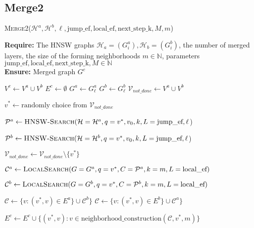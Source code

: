 \documentclass{article}
\begin{document}
\subsection{Merge2}





\begin{algorithm}
\caption{\textsc{Merge2}($\mathcal{H}^a, \mathcal{H}^b,  \ell, \text{jump\_ef}, \text{local\_ef}, \text{next\_step\_k}, M, m$)}\label{alg:merge2}
\textbf{Require:} The HNSW graphs $\mathcal{H}_a = (G^a_i), \mathcal{H}_b = (G^b_i)$, the number of merged layers, the size of the forming neighborhoods $m \in \mathbb{N} $, parameters $\text{jump\_ef}, \text{local\_ef}, \text{next\_step\_k}, M \in \mathbb{N}$ \\
\textbf{Ensure:}  Merged graph $G^c$ 
\begin{algorithmic}[1]

\State $V^c \gets V^a \cup V^b$
\State $E^c \gets \emptyset$
\State $G^a \gets G^a_{\ell} $
\State $G^b \gets G^b_{\ell} $
\State $\mathcal{V}_{not\_done} \gets V^a \cup V^b$

    \State $v^* \gets \text{randomly choice from } \mathcal{V}_{not\_done}$

    \State $\mathcal{P}^a  \gets \textsc{HNSW-Search}(\mathcal{H}=\mathcal{H}^a, q=v^*, v_0, k, L=\text{jump\_ef}, \ell $)

    \State $\mathcal{P}^b \gets \textsc{HNSW-Search}(\mathcal{H}=\mathcal{H}^b, q=v^*, v_0, k, L=\text{jump\_ef}, \ell $)
    
    
        \State $\mathcal{V}_{not\_done} \gets \mathcal{V}_{not\_done} \setminus \{v^*\}$
        

        \State $ \mathcal{C}^a  \gets \textsc{LocalSearch}(G=G^a, q=v^*, C=\mathcal{P}^a  , k=m, L=\text{local\_ef})$
        
        \State $\mathcal{C}^b \gets \textsc{LocalSearch}(G=G^b, q=v^*, C=\mathcal{P}^b , k=m, L=\text{local\_ef})$
        
            \State $\mathcal{C}\gets  \{v : (v^*, v) \in E^a \} \cup  \mathcal{C}^b\}$
        \Else
            \State $\mathcal{C} \gets  \{v : (v^*, v) \in E^b \} \cup  \mathcal{C}^a\}$
        \EndIf
        
        \State $E^c \gets E^c \cup \{ (v^*, v) : v \in \text{neighborhood\_construction}(\mathcal{C}, v^*, m) \}$
        

\end{algorithmic}
\end{algorithm}
\end{document}
